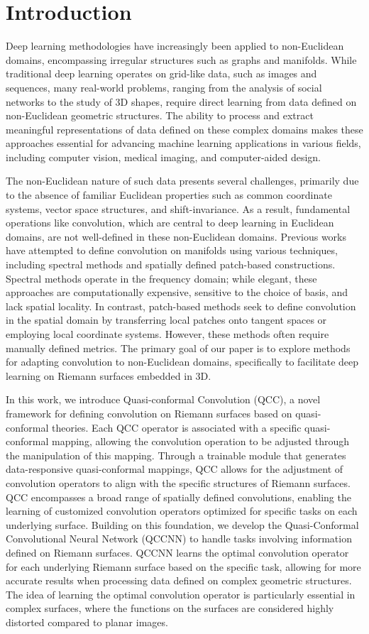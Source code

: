\section{Introduction}
Deep learning methodologies have increasingly been applied to non-Euclidean domains, encompassing irregular structures such as graphs and manifolds. While traditional deep learning operates on grid-like data, such as images and sequences, many real-world problems, ranging from the analysis of social networks to the study of 3D shapes, require direct learning from data defined on non-Euclidean geometric structures. The ability to process and extract meaningful representations of data defined on these complex domains makes these approaches essential for advancing machine learning applications in various fields, including computer vision, medical imaging, and computer-aided design.

The non-Euclidean nature of such data presents several challenges, primarily due to the absence of familiar Euclidean properties such as common coordinate systems, vector space structures, and shift-invariance. As a result, fundamental operations like convolution, which are central to deep learning in Euclidean domains, are not well-defined in these non-Euclidean domains. Previous works have attempted to define convolution on manifolds using various techniques, including spectral methods and spatially defined patch-based constructions. Spectral methods operate in the frequency domain; while elegant, these approaches are computationally expensive, sensitive to the choice of basis, and lack spatial locality. In contrast, patch-based methods seek to define convolution in the spatial domain by transferring local patches onto tangent spaces or employing local coordinate systems. However, these methods often require manually defined metrics. The primary goal of our paper is to explore methods for adapting convolution to non-Euclidean domains, specifically to facilitate deep learning on Riemann surfaces embedded in 3D.

In this work, we introduce Quasi-conformal Convolution (QCC), a novel framework for defining convolution on Riemann surfaces based on quasi-conformal theories. Each QCC operator is associated with a specific quasi-conformal mapping, allowing the convolution operation to be adjusted through the manipulation of this mapping. 
Through a trainable module that generates data-responsive quasi-conformal mappings, QCC allows for the adjustment of convolution operators to align with the specific structures of Riemann surfaces. QCC encompasses a broad range of spatially defined convolutions, enabling the learning of customized convolution operators optimized for specific tasks on each underlying surface. Building on this foundation, we develop the Quasi-Conformal Convolutional Neural Network (QCCNN) to handle tasks involving information defined on Riemann surfaces. QCCNN learns the optimal convolution operator for each underlying Riemann surface based on the specific task, allowing for more accurate results when processing data defined on complex geometric structures. The idea of learning the optimal convolution operator is particularly essential in complex surfaces, where the functions on the surfaces are considered highly distorted compared to planar images.

